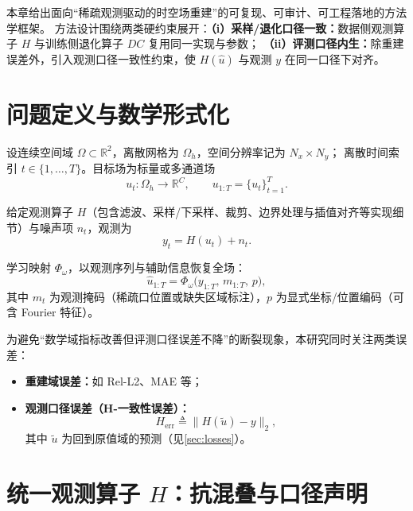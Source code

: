 
本章给出面向“稀疏观测驱动的时空场重建”的可复现、可审计、可工程落地的方法学框架。
方法设计围绕两类硬约束展开：\textbf{（i）采样/退化口径一致：}数据侧观测算子 $H$ 与训练侧退化算子 $DC$ 复用同一实现与参数；
\textbf{（ii）评测口径内生：}除重建误差外，引入观测口径一致性约束，使 $H(\hat{u})$ 与观测 $y$ 在同一口径下对齐。

\section{问题定义与数学形式化}
\label{sec:problem_formulation}

设连续空间域 $\Omega\subset\mathbb{R}^2$，离散网格为 $\Omega_h$，空间分辨率记为 $N_x\times N_y$；
离散时间索引 $t\in\{1,\dots,T\}$。目标场为标量或多通道场
\begin{equation}
u_t:\Omega_h\rightarrow \mathbb{R}^{C},\qquad u_{1:T}=\{u_t\}_{t=1}^{T}.
\end{equation}

给定观测算子 $H$（包含滤波、采样/下采样、裁剪、边界处理与插值对齐等实现细节）与噪声项 $n_t$，观测为
\begin{equation}
y_t = H(u_t) + n_t.
\label{eq:obs_model}
\end{equation}

学习映射 $\Phi_{\omega}$，以观测序列与辅助信息恢复全场：
\begin{equation}
\hat{u}_{1:T}=\Phi_{\omega}\big(y_{1:T},\, m_{1:T},\, p\big),
\label{eq:learn_map}
\end{equation}
其中 $m_t$ 为观测掩码（稀疏口位置或缺失区域标注），$p$ 为显式坐标/位置编码（可含 Fourier 特征）。

为避免“数学域指标改善但评测口径误差不降”的断裂现象，本研究同时关注两类误差：
\begin{itemize}
  \item \textbf{重建域误差：}如 Rel-L2、MAE 等；
  \item \textbf{观测口径误差（H-一致性误差）：}
  \begin{equation}
  H_{\mathrm{err}} \triangleq \big\| H(\tilde{u}) - y \big\|_2,
  \label{eq:Herr}
  \end{equation}
  其中 $\tilde{u}$ 为回到原值域的预测（见\autoref{sec:losses}）。
\end{itemize}

\section{统一观测算子 \texorpdfstring{$H$}{H}：抗混叠与口径声明}
\label{sec:H_define}

